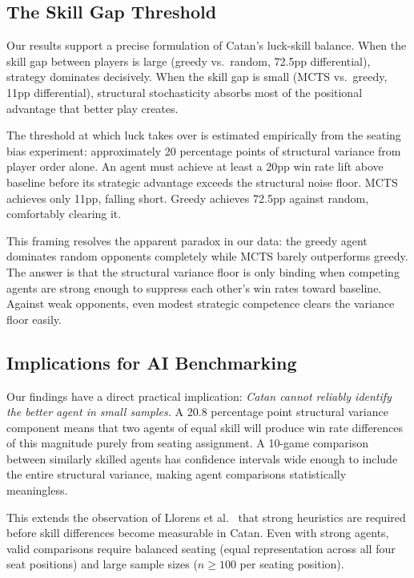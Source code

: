 \documentclass[12pt,a4paper]{article}
\begin{document}
{\subsection{The Skill Gap Threshold}

Our results support a precise formulation of Catan's luck-skill balance.
When the skill gap between players is large (greedy vs.\ random, 72.5pp
differential), strategy dominates decisively. When the skill gap is small
(MCTS vs.\ greedy, 11pp differential), structural stochasticity absorbs
most of the positional advantage that better play creates.

The threshold at which luck takes over is estimated empirically from the
seating bias experiment: approximately 20 percentage points of structural
variance from player order alone. An agent must achieve at least a 20pp
win rate lift above baseline before its strategic advantage exceeds the
structural noise floor. MCTS achieves only 11pp, falling short. Greedy
achieves 72.5pp against random, comfortably clearing it.

This framing resolves the apparent paradox in our data: the greedy agent
dominates random opponents completely while MCTS barely outperforms
greedy. The answer is that the structural variance floor is only binding
when competing agents are strong enough to suppress each other's win
rates toward baseline. Against weak opponents, even modest strategic
competence clears the variance floor easily.

\subsection{Implications for AI Benchmarking}

Our findings have a direct practical implication: \textit{Catan cannot
reliably identify the better agent in small samples.} A 20.8 percentage
point structural variance component means that two agents of equal skill
will produce win rate differences of this magnitude purely from seating
assignment. A 10-game comparison between similarly skilled agents has
confidence intervals wide enough to include the entire structural
variance, making agent comparisons statistically meaningless.

This extends the observation of Llorens et al.~\cite{llorens2025seeding}
that strong heuristics are required before skill differences become
measurable in Catan. Even with strong agents, valid comparisons require
balanced seating (equal representation across all four seat positions)
and large sample sizes ($n \geq 100$ per seating position).

}
\end{document}
